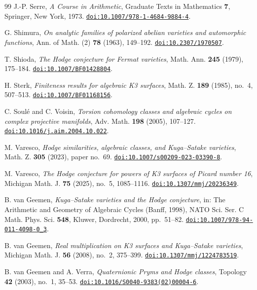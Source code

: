 \begin{thebibliography}{99}
J.-P. Serre,
\emph{A Course in Arithmetic},
Graduate Texts in Mathematics \textbf{7}, Springer, New York, 1973.
\href{https://doi.org/10.1007/978-1-4684-9884-4}{\nolinkurl{doi:10.1007/978-1-4684-9884-4}}.

G. Shimura,
\emph{On analytic families of polarized abelian varieties and automorphic functions},
Ann. of Math. (2) \textbf{78} (1963), 149--192.
\href{https://doi.org/10.2307/1970507}{\nolinkurl{doi:10.2307/1970507}}.

T. Shioda,
\emph{The Hodge conjecture for Fermat varieties},
Math. Ann. \textbf{245} (1979), 175--184.
\href{https://doi.org/10.1007/BF01428804}{\nolinkurl{doi:10.1007/BF01428804}}.

H. Sterk,
\emph{Finiteness results for algebraic K3 surfaces},
Math. Z. \textbf{189} (1985), no.~4, 507--513.
\href{https://doi.org/10.1007/BF01168156}{\nolinkurl{doi:10.1007/BF01168156}}.

C. Soul\'e and C. Voisin,
\emph{Torsion cohomology classes and algebraic cycles on complex projective manifolds},
Adv. Math. \textbf{198} (2005), 107--127.
\href{https://doi.org/10.1016/j.aim.2004.10.022}{\nolinkurl{doi:10.1016/j.aim.2004.10.022}}.

M. Varesco,
\emph{Hodge similarities, algebraic classes, and Kuga--Satake varieties},
Math. Z. \textbf{305} (2023), paper no.~69.
\href{https://doi.org/10.1007/s00209-023-03390-8}{\nolinkurl{doi:10.1007/s00209-023-03390-8}}.

M. Varesco,
\emph{The Hodge conjecture for powers of K3 surfaces of Picard number 16},
Michigan Math. J. \textbf{75} (2025), no.~5, 1085--1116.
\href{https://doi.org/10.1307/mmj/20236349}{\nolinkurl{doi:10.1307/mmj/20236349}}.

B. van Geemen,
\emph{Kuga--Satake varieties and the Hodge conjecture},
in: The Arithmetic and Geometry of Algebraic Cycles (Banff, 1998),
NATO Sci. Ser. C Math. Phys. Sci. \textbf{548},
Kluwer, Dordrecht, 2000, pp.~51--82.
\href{https://doi.org/10.1007/978-94-011-4098-0_3}{\nolinkurl{doi:10.1007/978-94-011-4098-0_3}}.

B. van Geemen,
\emph{Real multiplication on K3 surfaces and Kuga--Satake varieties},
Michigan Math. J. \textbf{56} (2008), no.~2, 375--399.
\href{https://doi.org/10.1307/mmj/1224783519}{\nolinkurl{doi:10.1307/mmj/1224783519}}.

B. van Geemen and A. Verra,
\emph{Quaternionic Pryms and Hodge classes},
Topology \textbf{42} (2003), no.~1, 35--53.
\href{https://doi.org/10.1016/S0040-9383(02)00004-6}{\nolinkurl{doi:10.1016/S0040-9383(02)00004-6}}.


\end{thebibliography}
